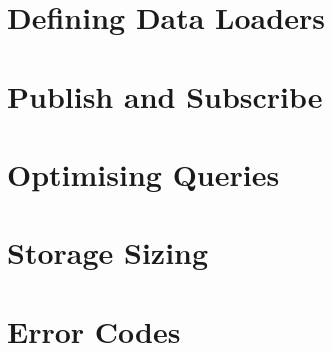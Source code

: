 \documentclass{scrreprt}
\begin{document}
\chapter{Defining Data Loaders}\label{chpt_loader}

\chapter{Publish and Subscribe}\label{chpt_pubsub}

\chapter{Optimising Queries}\label{chpt_opt}


\chapter{Storage Sizing}\label{chpt_sizing}

\chapter{Error Codes}\label{chpt_errors}

\end{document}
